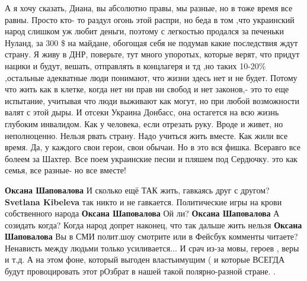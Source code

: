 \begin{itemize}
А я хочу сказать, Диана, вы абсолютно правы, мы разные, но в тоже время все
равны. Просто кто- то раздул огонь этой распри, но беда в том ,что украинский
народ слишком уж любит деньги, поэтому с легкостью продался за печеньки Нуланд,
за 300 \$ на майдане, обогощая себя не подумав какие последствия ждут страну. Я
живу в ДНР, поверьте, тут много упоротых, которые верят, что придут нацики и
будут, вешать, отправлять в концлагеря и тд ,но таких 10-20\% ,остальные
адекватные люди понимают, что жизни здесь нет и не будет. 
Потому что жить как в
клетке, когда нет ни прав ни свобод и нет законов,- это то еще испытание,
учитывая что люди выживают как могут, но при любой возможности валят с этой
дыры. 
И отсеки Украина Донбасс, она остагется на всю жизнь глубоким инвалидом.  Как у
человека, если отрезать руку. Вроде и живет, но неполноценно. Нельзя рвать
страну. 
Надо учиться жить вместе. Как жили все время. Да, у каждого свои герои, свои
обычаи. Но в это вся фишка. Всеравго все болеем за Шахтер. Все поем украинские
песни и пляшем под Сердючку. это как семья, все разные- но все вместе!
\begin{itemize}
\textbf{Оксана Шаповалова}
И сколько ещё ТАК жить, гавкаясь друг с другом?
\textbf{Svetlana Kibeleva} так никто и не гавкается. Политические игры на крови собственного народа
\textbf{Оксана Шаповалова}
Ой ли?
\textbf{Оксана Шаповалова}
А созидать когда?
Когда народ допрет наконец, что так дальше жить нельзя
\textbf{Оксана Шаповалова}
Вы в СМИ полит.шоу смотрите или в Фейсбук комменты читаете?
Ненависть между людьми только усиливается...
И срач из-за мовы, героев , веры и т.д. А на этом фоне, который выгоден
властьимущим ( и которые ВСЕГДА будут провоцировать этот рОзбрат в нашей такой
полярно-разной стране. .


\end{itemize}
\end{itemize}
